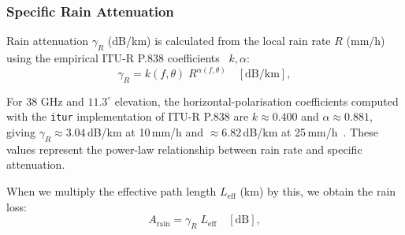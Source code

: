 \documentclass[conference]{IEEEtran}
\begin{document}
\subsubsection{Specific Rain Attenuation~\cite{itu_p838}}
Rain attenuation $\gamma_R$ (dB/km) is calculated from the local rain
rate $R$ (mm/h) using the empirical ITU-R P.838 coefficients~\cite{itu_p838} $k,\alpha$:
\begin{equation}
\gamma_R = k(f,\theta) \; R^{\alpha(f,\theta)} \quad [\mathrm{dB/km}],
\label{eq:rain_spec_atten}
\end{equation}

For 38 GHz and $11.3^\circ$ elevation, the horizontal-polarisation coefficients computed with the \texttt{itur} implementation of ITU-R P.838 are $k\approx0.400$ and $\alpha\approx0.881$, giving $\gamma_R\approx3.04$\,dB/km at 10\,mm/h and $\approx6.82$\,dB/km at 25\,mm/h~\cite{itu_p838}. These values represent the power-law relationship between rain rate and specific attenuation.

When we multiply the effective path length $L_\mathrm{eff}$ (km) by this, we
obtain the rain loss:
\begin{equation}
A_\mathrm{rain} = \gamma_R \; L_\mathrm{eff} \quad [\mathrm{dB}],
\label{eq:rain_loss}
\end{equation}
\end{document}

